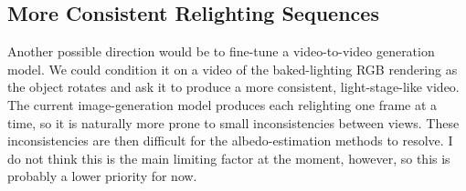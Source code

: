 \documentclass[11pt]{article}
\begin{document}
\subsection{More Consistent Relighting Sequences}

Another possible direction would be to fine-tune a video-to-video generation
model. We could condition it on a video of the baked-lighting RGB rendering as
the object rotates and ask it to produce a more consistent, light-stage-like
video. The current image-generation model produces each relighting one frame
at a time, so it is naturally more prone to small inconsistencies between
views. These inconsistencies are then difficult for the albedo-estimation
methods to resolve. I do not think this is the main limiting factor at the
moment, however, so this is probably a lower priority for now.
\end{document}
